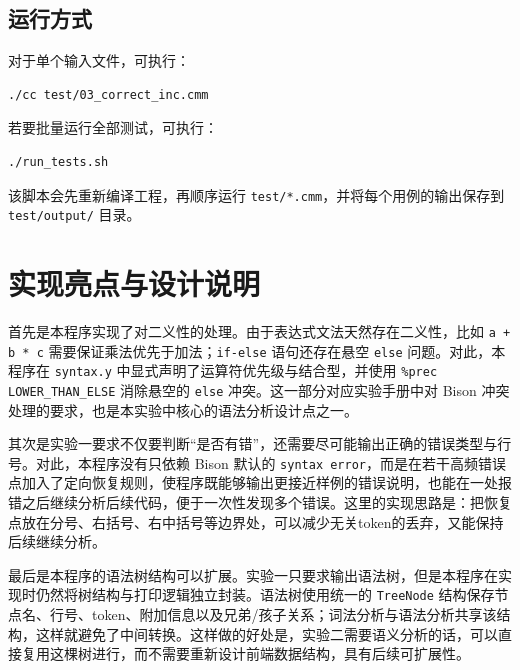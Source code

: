 \documentclass[11pt,a4paper]{ctexart}
\newcommand{\code}[1]{\texttt{#1}}
\begin{document}
\subsection{运行方式}
对于单个输入文件，可执行：
\begin{Verbatim}[fontsize=\small]
./cc test/03_correct_inc.cmm
\end{Verbatim}

若要批量运行全部测试，可执行：
\begin{Verbatim}[fontsize=\small]
./run_tests.sh
\end{Verbatim}
该脚本会先重新编译工程，再顺序运行 \code{test/*.cmm}，并将每个用例的输出保存到 \code{test/output/} 目录。

\section{实现亮点与设计说明}

首先是本程序实现了对二义性的处理。由于表达式文法天然存在二义性，比如 \code{a + b * c} 需要保证乘法优先于加法；\code{if-else} 语句还存在悬空 \code{else} 问题。对此，本程序在 \code{syntax.y} 中显式声明了运算符优先级与结合型，并使用 \code{\%prec LOWER\_THAN\_ELSE} 消除悬空的 \code{else} 冲突。这一部分对应实验手册中对 Bison 冲突处理的要求，也是本实验中核心的语法分析设计点之一。

其次是实验一要求不仅要判断“是否有错”，还需要尽可能输出正确的错误类型与行号。对此，本程序没有只依赖 Bison 默认的 \code{syntax error}，而是在若干高频错误点加入了定向恢复规则，使程序既能够输出更接近样例的错误说明，也能在一处报错之后继续分析后续代码，便于一次性发现多个错误。这里的实现思路是：把恢复点放在分号、右括号、右中括号等边界处，可以减少无关token的丢弃，又能保持后续继续分析。

最后是本程序的语法树结构可以扩展。实验一只要求输出语法树，但是本程序在实现时仍然将树结构与打印逻辑独立封装。语法树使用统一的 \code{TreeNode} 结构保存节点名、行号、token、附加信息以及兄弟/孩子关系；词法分析与语法分析共享该结构，这样就避免了中间转换。这样做的好处是，实验二需要语义分析的话，可以直接复用这棵树进行，而不需要重新设计前端数据结构，具有后续可扩展性。
\end{document}
